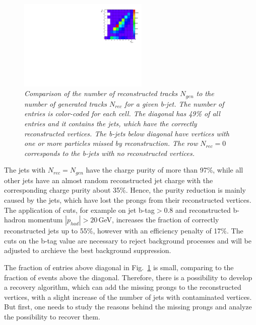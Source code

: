 \begin{figure}[h]
{\centering
    \includegraphics[width=0.55\textwidth]{ILD/plots/rec-gen-table.pdf}
    \caption{\sl Comparison of the number of reconstructed tracks $N_{gen}$ to the number of generated tracks $N_{rec}$ for a given b-jet. The number of entries is color-coded for each cell. The diagonal has 49\% of all entries and it contains the jets, which have the correctly reconstructed vertices. The b-jets below diagonal have vertices with one or more particles missed by reconstruction. The row $N_{rec} = 0$ corresponds to the b-jets with no reconstructed vertices. %
    }
    \label{fig:Table_3}
  }
\end{figure}

The jets with $N_{rec}=N_{gen}$ have the charge purity of more than 97\%, while all other jets have an almost random reconstructed jet charge with the corresponding charge purity about 35\%. 
Hence, the purity reduction is mainly caused by the jets, which have lost the prongs from their reconstructed vertices. 
The application of cuts, for example on jet b-tag$>0.8$ and reconstructed b-hadron momentum $|p_{had}| > 20$\,GeV, increases the fraction of correctly reconstructed jets up to 55\%, however with an efficiency penalty of 17\%.
The cuts on the b-tag value are necessary to reject background processes and will be adjusted to archieve the best background suppression. 

The fraction of entries above diagonal in Fig.~\ref{fig:Table_3} is small, comparing to the fraction of events above the diagonal. 
Therefore, there is a possibility to develop a recovery algorithm, which can add the missing prongs to the reconstructed vertices, with a slight increase of the number of jets with contaminated vertices. 
But first, one needs to study the reasons behind the missing prongs and analyze the possibility to recover them. 

